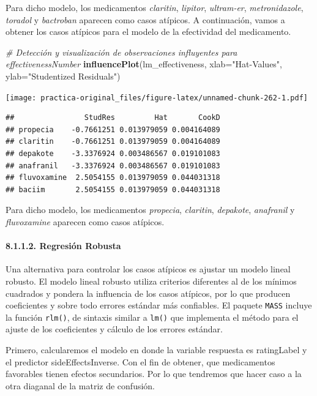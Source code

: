 \documentclass[spanish,]{article}
\newenvironment{Shaded}{\begin{snugshade}}{\end{snugshade}}
\newcommand{\KeywordTok}[1]{\textcolor[rgb]{0.13,0.29,0.53}{\textbf{#1}}}
\newcommand{\DataTypeTok}[1]{\textcolor[rgb]{0.13,0.29,0.53}{#1}}
\newcommand{\StringTok}[1]{\textcolor[rgb]{0.31,0.60,0.02}{#1}}
\newcommand{\CommentTok}[1]{\textcolor[rgb]{0.56,0.35,0.01}{\textit{#1}}}
\newcommand{\NormalTok}[1]{#1}
\let\oldparagraph\paragraph
\renewcommand{\paragraph}[1]{\oldparagraph{#1}\mbox{}}
\begin{document}
Para dicho modelo, los medicamentos \emph{claritin}, \emph{lipitor},
\emph{ultram-er}, \emph{metronidazole}, \emph{toradol} y
\emph{bactroban} aparecen como casos atípicos. A continuación, vamos a
obtener los casos atípicos para el modelo de la efectividad del
medicamento.

\begin{Shaded}
\begin{Highlighting}[]
\CommentTok{# Detección y visualización de observaciones influyentes para effectivenessNumber}
\KeywordTok{influencePlot}\NormalTok{(lm_effectiveness, }\DataTypeTok{xlab=}\StringTok{"Hat-Values"}\NormalTok{, }\DataTypeTok{ylab=}\StringTok{"Studentized Residuals"}\NormalTok{)}
\end{Highlighting}
\end{Shaded}

\texttt{[image: practica-original\_files/figure-latex/unnamed-chunk-262-1.pdf]}

\begin{verbatim}
##                StudRes         Hat       CookD
## propecia    -0.7661251 0.013979059 0.004164089
## claritin    -0.7661251 0.013979059 0.004164089
## depakote    -3.3376924 0.003486567 0.019101083
## anafranil   -3.3376924 0.003486567 0.019101083
## fluvoxamine  2.5054155 0.013979059 0.044031318
## baciim       2.5054155 0.013979059 0.044031318
\end{verbatim}

Para dicho modelo, los medicamentos \emph{propecia}, \emph{claritin},
\emph{depakote}, \emph{anafranil} y \emph{fluvoxamine} aparecen como
casos atípicos.

\paragraph{8.1.1.2. Regresión Robusta}\label{regresion-robusta}

Una alternativa para controlar los casos atípicos es ajustar un modelo
lineal robusto. El modelo lineal robusto utiliza criterios diferentes al
de los mínimos cuadrados y pondera la influencia de los casos atípicos,
por lo que producen coeficientes y sobre todo errores estándar más
confiables. El paquete \texttt{MASS} incluye la función \texttt{rlm()},
de sintaxis similar a \texttt{lm()} que implementa el método para el
ajuste de los coeficientes y cálculo de los errores estándar.

Primero, calcularemos el modelo en donde la variable respuesta es
ratingLabel y el predictor sideEffectsInverse. Con el fin de obtener,
que medicamentos favorables tienen efectos secundarios. Por lo que
tendremos que hacer caso a la otra diaganal de la matriz de confusión.
\end{document}
